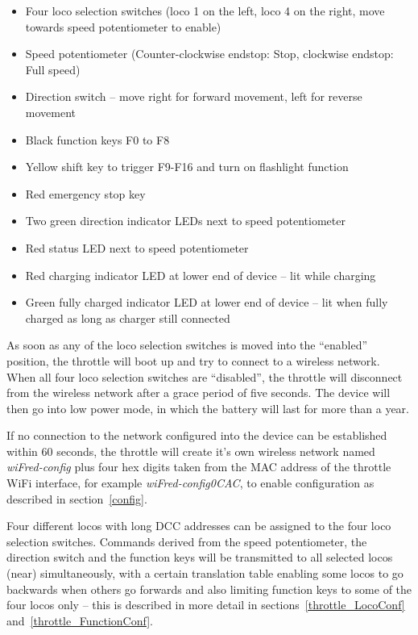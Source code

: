 \documentclass[11pt,a4paper]{scrartcl}
\begin{document}
\begin{itemize}
\item Four loco selection switches (loco 1 on the left, loco 4 on the right, move towards speed potentiometer to enable)
\item Speed potentiometer (Counter-clockwise endstop: Stop, clockwise endstop: Full speed)
\item Direction switch -- move right for forward movement, left for reverse movement
\item Black function keys F0 to F8
\item Yellow shift key to trigger F9-F16 and turn on flashlight function
\item Red emergency stop key
\item Two green direction indicator LEDs next to speed potentiometer
\item Red status LED next to speed potentiometer
\item Red charging indicator LED at lower end of device -- lit while charging
\item Green fully charged indicator LED at lower end of device -- lit when fully charged as long as charger still connected
\end{itemize}

As soon as any of the loco selection switches is moved into the ``enabled'' position, the throttle will boot up and try to connect to a wireless network. When all four loco selection switches are ``disabled'', the throttle will disconnect from the wireless network after a grace period of five seconds. The device will then go into low power mode, in which the battery will last for more than a year.

If no connection to the network configured into the device can be established within 60 seconds, the throttle will create it's own wireless network named \textit{wiFred-config} plus four hex digits taken from the MAC address of the throttle WiFi interface, for example \textit{wiFred-config0CAC}, to enable configuration as described in section~\ref{config}.

Four different locos with long DCC addresses can be assigned to the four loco selection switches. Commands derived from the speed potentiometer, the direction switch and the function keys will be transmitted to all selected locos (near) simultaneously, with a certain translation table enabling some locos to go backwards when others go forwards and also limiting function keys to some of the four locos only -- this is described in more detail in sections~\ref{throttle_LocoConf} and~\ref{throttle_FunctionConf}.
\end{document}
